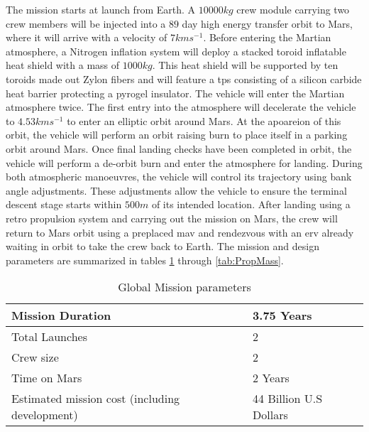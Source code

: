 The mission starts at launch from Earth. A $10000 kg$ crew module carrying two crew members will be injected into a $89$ day high energy transfer orbit to Mars, where it will arrive with a velocity of $7 kms^{-1}$. Before entering the Martian atmosphere, a Nitrogen inflation system will deploy a stacked toroid inflatable heat shield with a mass of $1000 kg$. This heat shield will be supported by ten toroids made out Zylon fibers and will feature a \gls{tps} consisting of a silicon carbide heat barrier protecting a pyrogel insulator. The vehicle will enter the Martian atmosphere twice. The first entry into the atmosphere will decelerate the vehicle to $4.53 kms^{-1}$ to enter an elliptic orbit around Mars. At the apoareion of this orbit, the vehicle will perform an orbit raising burn to place itself in a parking orbit around Mars. Once final landing checks have been completed in orbit, the vehicle will perform a de-orbit burn and enter the atmosphere for landing. During both atmospheric manoeuvres, the vehicle will control its trajectory using bank angle adjustments. These adjustments allow the vehicle to ensure the terminal descent stage starts within $500m$ of its intended location. After landing using a retro propulsion system and carrying out the mission on Mars, the crew will return to Mars orbit using a preplaced \gls{mav} and rendezvous with an \gls{erv} already waiting in orbit to take the crew back to Earth. The mission and design parameters are summarized in tables \ref{tab:MissionPar} through \ref{tab:PropMass}.


\begin{table}
	\centering
	\caption{Global Mission parameters}
	\label{tab:MissionPar}
	\begin{tabular}{|l|l|} \hline
		Mission Duration				             	& 	3.75 Years						\\ \hline 
		Total Launches       							&	2  		   	  					\\ \hline
		Crew size				 						&	2     	  						\\ \hline
		Time on Mars				              	   	&  	2 Years    						\\ \hline
		Estimated mission cost (including development) 	&  	44 Billion U.S Dollars			\\ \hline
	\end{tabular}
\end{table}

